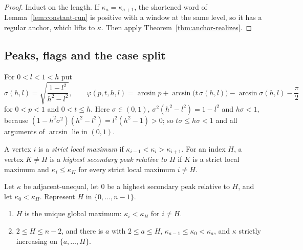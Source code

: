 \begin{proof}
Induct on the length. If $\kappa_a=\kappa_{a+1}$, the shortened word of
Lemma~\ref{lem:constant-run} is positive with a window at the same level, so
it has a regular anchor, which lifts to $\kappa$. Then apply
Theorem~\ref{thm:anchor-realizes}.
\end{proof}

\subsection{Peaks, flags and the case split}\label{ss:split}

For $0<l<1<h$ put
\begin{equation}\label{eq:flag}
  \sigma(h,l)=\sqrt{\frac{1-l^2}{h^2-l^2}},\qquad
  \varphi(p,t,h,l)=\arcsin p+\arcsin\bigl(t\,\sigma(h,l)\bigr)
  -\arcsin\sigma(h,l)-\frac\pi2
\end{equation}
for $0<p<1$ and $0<t\le h$. Here $\sigma\in(0,1)$,
$\sigma^2(h^2-l^2)=1-l^2$ and $h\sigma<1$, because
$(1-h^2\sigma^2)(h^2-l^2)=l^2(h^2-1)>0$; so $t\sigma\le h\sigma<1$ and all
arguments of $\arcsin$ lie in $(0,1)$.

A vertex $i$ is a \emph{strict local maximum} if
$\kappa_{i-1}<\kappa_i>\kappa_{i+1}$. For an index $H$, a vertex $K\ne H$ is a
\emph{highest secondary peak relative to $H$} if $K$ is a strict local
maximum and $\kappa_i\le\kappa_K$ for every strict local maximum $i\ne H$.

\begin{lemma}\label{lem:peak}
Let $\kappa$ be adjacent-unequal, let $0$ be a highest secondary peak relative
to $H$, and let $\kappa_0<\kappa_H$. Represent $H$ in $\{0,\dots,n-1\}$.
\begin{enumerate}[label=\textup{(\alph*)}]
\item $H$ is the unique global maximum: $\kappa_i<\kappa_H$ for $i\ne H$.
\item $2\le H\le n-2$, and there is $a$ with $2\le a\le H$,
  $\kappa_{a-1}\le\kappa_0<\kappa_a$, and $\kappa$ strictly increasing on
  $\{a,\dots,H\}$.
\end{enumerate}
\end{lemma}

